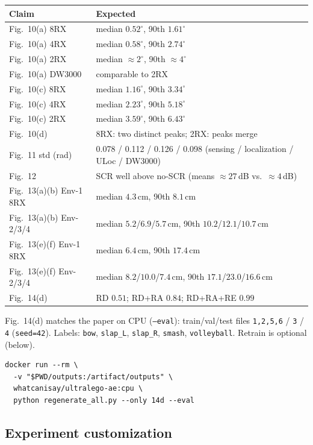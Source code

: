 \documentclass[10pt,twocolumn]{article}
\begin{document}
{\small
\noindent\begin{tabularx}{\linewidth}{@{}lL@{}}
\toprule
Claim & Expected \\
\midrule
Fig.~10(a) 8RX
  & median $0.52^\circ$, 90th $1.61^\circ$ \\
Fig.~10(a) 4RX
  & median $0.58^\circ$, 90th $2.74^\circ$ \\
Fig.~10(a) 2RX
  & median ${\approx}2^\circ$, 90th ${\approx}4^\circ$ \\
Fig.~10(a) DW3000
  & comparable to 2RX \\
Fig.~10(c) 8RX
  & median $1.16^\circ$, 90th $3.34^\circ$ \\
Fig.~10(c) 4RX
  & median $2.23^\circ$, 90th $5.18^\circ$ \\
Fig.~10(c) 2RX
  & median $3.59^\circ$, 90th $6.43^\circ$ \\
Fig.~10(d)
  & 8RX: two distinct peaks; 2RX: peaks merge \\
Fig.~11 std (rad)
  & 0.078 / 0.112 / 0.126 / 0.098
    (sensing / localization / ULoc / DW3000) \\
Fig.~12
  & SCR well above no-SCR (means ${\approx}27$\,dB vs.\ ${\approx}4$\,dB) \\
Fig.~13(a)(b) Env-1 8RX
  & median $4.3$\,cm, 90th $8.1$\,cm \\
Fig.~13(a)(b) Env-2/3/4
  & median $5.2$/$6.9$/$5.7$\,cm, 90th $10.2$/$12.1$/$10.7$\,cm \\
Fig.~13(e)(f) Env-1 8RX
  & median $6.4$\,cm, 90th $17.4$\,cm \\
Fig.~13(e)(f) Env-2/3/4
  & median $8.2$/$10.0$/$7.4$\,cm, 90th $17.1$/$23.0$/$16.6$\,cm \\
Fig.~14(d)
  & RD $0.51$; RD+RA $0.84$; RD+RA+RE $0.99$ \\
\bottomrule
\end{tabularx}
}

\vspace{0.35em}
Fig.~14(d) matches the paper on CPU (\texttt{--eval}): train/val/test
files \texttt{1,2,5,6} / \texttt{3} / \texttt{4} (\texttt{seed=42}).
Labels: \texttt{bow}, \texttt{slap\_L}, \texttt{slap\_R},
\texttt{smash}, \texttt{volleyball}. Retrain is optional (below).

\begin{lstlisting}
docker run --rm \
  -v "$PWD/outputs:/artifact/outputs" \
  whatcanisay/ultralego-ae:cpu \
  python regenerate_all.py --only 14d --eval
\end{lstlisting}

\subsection{Experiment customization}
\end{document}
